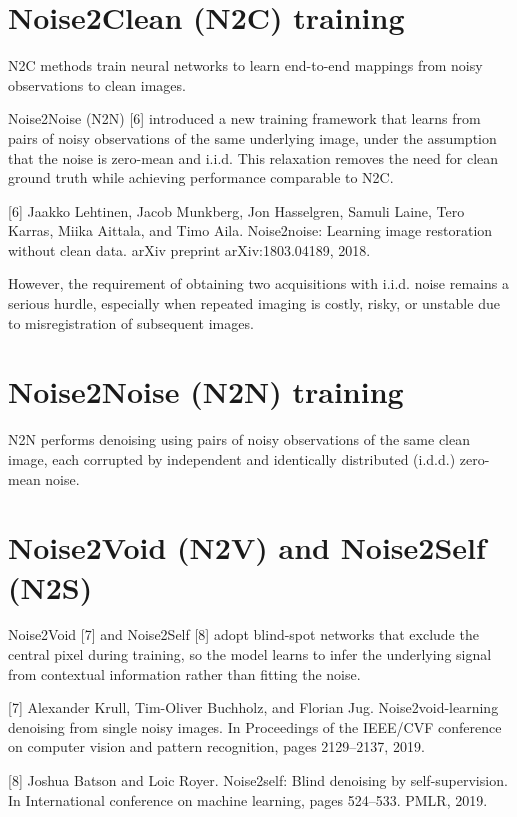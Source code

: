 \section{Noise2Clean (N2C) training}
N2C methods train neural networks to learn end-to-end mappings
from noisy observations to clean images. %

Noise2Noise (N2N) [6] introduced a new training framework that learns
from pairs of noisy observations of the same underlying image, under
the assumption that the noise is zero-mean and i.i.d. This relaxation
removes the need for clean ground truth while achieving performance
comparable to N2C. %

[6] Jaakko Lehtinen, Jacob Munkberg, Jon Hasselgren, Samuli Laine, Tero Karras, Miika Aittala, and Timo Aila.
Noise2noise: Learning image restoration without clean data. arXiv preprint arXiv:1803.04189, 2018.

However, the requirement of obtaining two acquisitions with
i.i.d. noise remains a serious hurdle, especially when repeated
imaging is costly, risky, or unstable due to misregistration of
subsequent images. %

\section{Noise2Noise (N2N) training}
N2N performs denoising using pairs of noisy observations of the same
clean image, each corrupted by independent and identically distributed
(i.d.d.) zero-mean noise. %

\section{Noise2Void (N2V) and Noise2Self (N2S)}
Noise2Void [7] and Noise2Self [8] adopt blind-spot networks that
exclude the central pixel during training, so the model learns to
infer the underlying signal from contextual information rather than
fitting the noise. %

[7] Alexander Krull, Tim-Oliver Buchholz, and Florian Jug. Noise2void-learning denoising from single noisy images.
In Proceedings of the IEEE/CVF conference on computer vision and pattern recognition, pages 2129–2137, 2019.

[8] Joshua Batson and Loic Royer. Noise2self: Blind denoising by self-supervision. In International conference on
machine learning, pages 524–533. PMLR, 2019.

